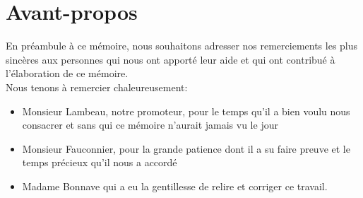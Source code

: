 
\newpage
\chapter*{Avant-propos}
En préambule à ce mémoire, nous souhaitons adresser nos remerciements les plus sincères aux personnes qui nous ont apporté
leur aide et qui ont contribué à l'élaboration de ce mémoire.\\
\newline
\indent
Nous tenons à remercier chaleureusement:
\begin{itemize}
\item Monsieur Lambeau, notre promoteur, pour le temps qu'il a bien voulu nous consacrer et sans qui ce mémoire n'aurait jamais vu le jour\\

\item Monsieur Fauconnier, pour la grande patience dont il a su faire preuve et le temps précieux qu'il nous a accordé\\
\item Madame Bonnave qui a eu la gentillesse de relire et corriger ce travail.\\
\end{itemize}
